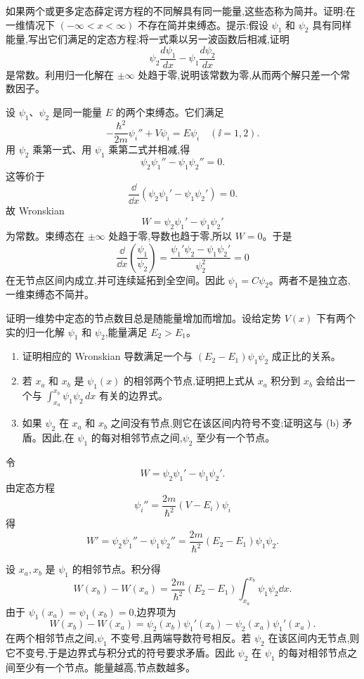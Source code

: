 \begin{question}
如果两个或更多定态薛定谔方程的不同解具有同一能量,这些态称为简并。证明:在一维情况下 $(-\infty<x<\infty)$ 不存在简并束缚态。提示:假设 $\psi_1$ 和 $\psi_2$ 具有同样能量,写出它们满足的定态方程;将一式乘以另一波函数后相减,证明
\[
\psi_2\frac{d\psi_1}{dx}-\psi_1\frac{d\psi_2}{dx}
\]
是常数。利用归一化解在 $\pm\infty$ 处趋于零,说明该常数为零,从而两个解只差一个常数因子。
\end{question}
\begin{solution}
设 $\psi_1$、$\psi_2$ 是同一能量 $E$ 的两个束缚态。它们满足
\[
-\frac{\hbar^2}{2m}\psi_i''+V\psi_i=E\psi_i\quad(\ii=1,2).
\]
用 $\psi_2$ 乘第一式、用 $\psi_1$ 乘第二式并相减,得
\[
\psi_2\psi_1''-\psi_1\psi_2''=0.
\]
这等价于
\[
\frac{\dd}{\dd x}\left(\psi_2\psi_1'-\psi_1\psi_2'\right)=0.
\]
故 Wronskian
\[
W=\psi_2\psi_1'-\psi_1\psi_2'
\]
为常数。束缚态在 $\pm\infty$ 处趋于零,导数也趋于零,所以 $W=0$。于是
\[
\frac{\dd}{\dd x}\left(\frac{\psi_1}{\psi_2}\right)=\frac{\psi_1'\psi_2-\psi_1\psi_2'}{\psi_2^2}=0
\]
在无节点区间内成立,并可连续延拓到全空间。因此 $\psi_1=C\psi_2$。两者不是独立态,一维束缚态不简并。
\end{solution}

\begin{question}
证明一维势中定态的节点数目总是随能量增加而增加。设给定势 $V(x)$ 下有两个实的归一化解 $\psi_1$ 和 $\psi_2$,能量满足 $E_2>E_1$。
\begin{enumerate}
\item 证明相应的 Wronskian 导数满足一个与 $(E_2-E_1)\psi_1\psi_2$ 成正比的关系。
\item 若 $x_a$ 和 $x_b$ 是 $\psi_1(x)$ 的相邻两个节点,证明把上式从 $x_a$ 积分到 $x_b$ 会给出一个与 $\int_{x_a}^{x_b}\psi_1\psi_2\,dx$ 有关的边界式。
\item 如果 $\psi_2$ 在 $x_a$ 和 $x_b$ 之间没有节点,则它在该区间内符号不变;证明这与 (b) 矛盾。因此,在 $\psi_1$ 的每对相邻节点之间,$\psi_2$ 至少有一个节点。
\end{enumerate}
\end{question}
\begin{solution}
令
\[
W=\psi_2\psi_1'-\psi_1\psi_2'.
\]
由定态方程
\[
\psi_i''=\frac{2m}{\hbar^2}(V-E_i)\psi_i
\]
得
\[
W'=\psi_2\psi_1''-\psi_1\psi_2''
=\frac{2m}{\hbar^2}(E_2-E_1)\psi_1\psi_2.
\]

设 $x_a,x_b$ 是 $\psi_1$ 的相邻节点。积分得
\[
W(x_b)-W(x_a)=\frac{2m}{\hbar^2}(E_2-E_1)
\int_{x_a}^{x_b}\psi_1\psi_2\dd x.
\]
由于 $\psi_1(x_a)=\psi_1(x_b)=0$,边界项为
\[
W(x_b)-W(x_a)=\psi_2(x_b)\psi_1'(x_b)-\psi_2(x_a)\psi_1'(x_a).
\]
在两个相邻节点之间,$\psi_1$ 不变号,且两端导数符号相反。若 $\psi_2$ 在该区间内无节点,则它不变号,于是边界式与积分式的符号要求矛盾。因此 $\psi_2$ 在 $\psi_1$ 的每对相邻节点之间至少有一个节点。能量越高,节点数越多。
\end{solution}

